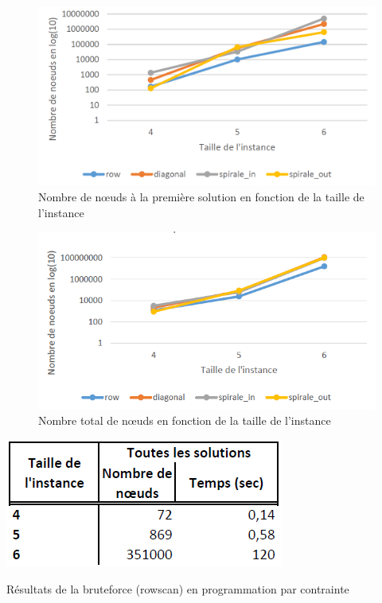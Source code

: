 \begin{appendices}
	\begin{figure}[H]
		\includegraphics[width=\linewidth]{images/resultat_bruteforce_graphique_first}
		\caption{Nombre de n\oe uds à la première solution en fonction de la taille de l'instance}
		\label{fig:results_bruteforce_graphique_first}
	\end{figure}
	
	\begin{figure}[H]
		\includegraphics[width=\linewidth]{images/resultat_bruteforce_graphique_all}
		\caption{Nombre total de n\oe uds en fonction de la taille de l'instance}
		\label{fig:results_bruteforce_graphique_all}
	\end{figure}
	
	\begin{table}[H]
		\centering
		\includegraphics[width=0.6\linewidth]{images/resultat_bruteforce_rowscan_bourreau}
		\caption{Résultats de la bruteforce (rowscan) en programmation par contrainte}
	\end{table}
	

\end{appendices}
